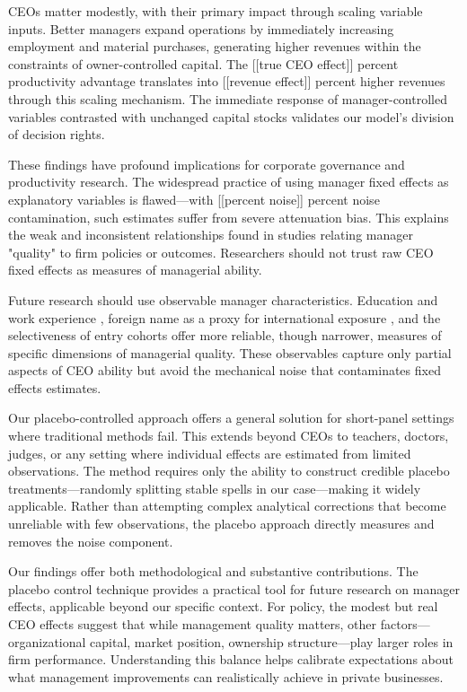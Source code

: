 \documentclass[11pt,a4paper]{article}
\begin{document}
CEOs matter modestly, with their primary impact through scaling variable inputs. Better managers expand operations by immediately increasing employment and material purchases, generating higher revenues within the constraints of owner-controlled capital. The [[true CEO effect]] percent productivity advantage translates into [[revenue effect]] percent higher revenues through this scaling mechanism. The immediate response of manager-controlled variables contrasted with unchanged capital stocks validates our model's division of decision rights.

These findings have profound implications for corporate governance and productivity research. The widespread practice of using manager fixed effects as explanatory variables is flawed—with [[percent noise]] percent noise contamination, such estimates suffer from severe attenuation bias. This explains the weak and inconsistent relationships found in studies relating manager "quality" to firm policies or outcomes. Researchers should not trust raw CEO fixed effects as measures of managerial ability.

Future research should use observable manager characteristics. Education and work experience \citep{DePirro2025}, foreign name as a proxy for international exposure \citep{Koren2023expat}, and the selectiveness of entry cohorts \citep{koren2024managers} offer more reliable, though narrower, measures of specific dimensions of managerial quality. These observables capture only partial aspects of CEO ability but avoid the mechanical noise that contaminates fixed effects estimates.

Our placebo-controlled approach offers a general solution for short-panel settings where traditional methods fail. This extends beyond CEOs to teachers, doctors, judges, or any setting where individual effects are estimated from limited observations. The method requires only the ability to construct credible placebo treatments—randomly splitting stable spells in our case—making it widely applicable. Rather than attempting complex analytical corrections that become unreliable with few observations, the placebo approach directly measures and removes the noise component.

Our findings offer both methodological and substantive contributions. The placebo control technique provides a practical tool for future research on manager effects, applicable beyond our specific context. For policy, the modest but real CEO effects suggest that while management quality matters, other factors—organizational capital, market position, ownership structure—play larger roles in firm performance. Understanding this balance helps calibrate expectations about what management improvements can realistically achieve in private businesses.
\end{document}
